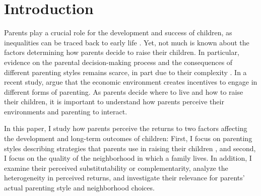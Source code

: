\documentclass[12pt, a4paper, english]{article}
\begin{document}
\onehalfspacing
\clearpage
\section{Introduction}

Parents play a crucial role for the development and success of children, as inequalities can be traced back to early life \citep{FrancesconiHeckman2016,Kalil2015}. 
Yet, not much is known about the factors determining how parents decide to raise their children. In particular, evidence on the parental decision-making process and the consequences of different parenting styles remains scarce, in part due to their complexity \citep{Attanasio2015}. 
In a recent study, \citet{DoepkeZilibotti2017} argue that the economic environment creates incentives to engage in different forms of parenting. As parents decide where to live and how to raise their children, it is important to understand how parents perceive their environments and parenting to interact. 

In this paper, I study how parents perceive the returns to two factors affecting the development and long-term outcomes of children: First, I focus on parenting styles describing strategies that parents use in raising their children \citep{Baumrind1967}, and second, I focus on the quality of the neighborhood in which a family lives. In addition, I examine their perceived substitutability or complementarity, analyze the heterogeneity in perceived returns, and investigate their relevance for parents' actual parenting style and neighborhood choices. 
\end{document}
